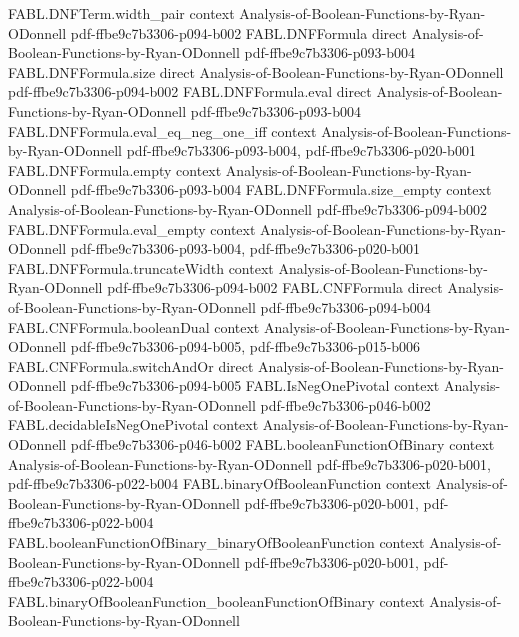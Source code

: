\begin{theorem}
  {FABL.DNFTerm.width_pair}
  {context}
  {Analysis-of-Boolean-Functions-by-Ryan-ODonnell}
  {pdf-ffbe9c7b3306-p094-b002}
\proofstep
  {FABL.DNFFormula}
  {direct}
  {Analysis-of-Boolean-Functions-by-Ryan-ODonnell}
  {pdf-ffbe9c7b3306-p093-b004}
\proofstep
  {FABL.DNFFormula.size}
  {direct}
  {Analysis-of-Boolean-Functions-by-Ryan-ODonnell}
  {pdf-ffbe9c7b3306-p094-b002}
\proofstep
  {FABL.DNFFormula.eval}
  {direct}
  {Analysis-of-Boolean-Functions-by-Ryan-ODonnell}
  {pdf-ffbe9c7b3306-p093-b004}
\proofstep
  {FABL.DNFFormula.eval_eq_neg_one_iff}
  {context}
  {Analysis-of-Boolean-Functions-by-Ryan-ODonnell}
  {pdf-ffbe9c7b3306-p093-b004,
    pdf-ffbe9c7b3306-p020-b001}
\proofstep
  {FABL.DNFFormula.empty}
  {context}
  {Analysis-of-Boolean-Functions-by-Ryan-ODonnell}
  {pdf-ffbe9c7b3306-p093-b004}
\proofstep
  {FABL.DNFFormula.size_empty}
  {context}
  {Analysis-of-Boolean-Functions-by-Ryan-ODonnell}
  {pdf-ffbe9c7b3306-p094-b002}
\proofstep
  {FABL.DNFFormula.eval_empty}
  {context}
  {Analysis-of-Boolean-Functions-by-Ryan-ODonnell}
  {pdf-ffbe9c7b3306-p093-b004,
    pdf-ffbe9c7b3306-p020-b001}
\proofstep
  {FABL.DNFFormula.truncateWidth}
  {context}
  {Analysis-of-Boolean-Functions-by-Ryan-ODonnell}
  {pdf-ffbe9c7b3306-p094-b002}
\proofstep
  {FABL.CNFFormula}
  {direct}
  {Analysis-of-Boolean-Functions-by-Ryan-ODonnell}
  {pdf-ffbe9c7b3306-p094-b004}
\proofstep
  {FABL.CNFFormula.booleanDual}
  {context}
  {Analysis-of-Boolean-Functions-by-Ryan-ODonnell}
  {pdf-ffbe9c7b3306-p094-b005,
    pdf-ffbe9c7b3306-p015-b006}
\proofstep
  {FABL.CNFFormula.switchAndOr}
  {direct}
  {Analysis-of-Boolean-Functions-by-Ryan-ODonnell}
  {pdf-ffbe9c7b3306-p094-b005}
\proofstep
  {FABL.IsNegOnePivotal}
  {context}
  {Analysis-of-Boolean-Functions-by-Ryan-ODonnell}
  {pdf-ffbe9c7b3306-p046-b002}
\proofstep
  {FABL.decidableIsNegOnePivotal}
  {context}
  {Analysis-of-Boolean-Functions-by-Ryan-ODonnell}
  {pdf-ffbe9c7b3306-p046-b002}
\proofstep
  {FABL.booleanFunctionOfBinary}
  {context}
  {Analysis-of-Boolean-Functions-by-Ryan-ODonnell}
  {pdf-ffbe9c7b3306-p020-b001,
    pdf-ffbe9c7b3306-p022-b004}
\proofstep
  {FABL.binaryOfBooleanFunction}
  {context}
  {Analysis-of-Boolean-Functions-by-Ryan-ODonnell}
  {pdf-ffbe9c7b3306-p020-b001,
    pdf-ffbe9c7b3306-p022-b004}
\proofstep
  {FABL.booleanFunctionOfBinary_binaryOfBooleanFunction}
  {context}
  {Analysis-of-Boolean-Functions-by-Ryan-ODonnell}
  {pdf-ffbe9c7b3306-p020-b001,
    pdf-ffbe9c7b3306-p022-b004}
\proofstep
  {FABL.binaryOfBooleanFunction_booleanFunctionOfBinary}
  {context}
  {Analysis-of-Boolean-Functions-by-Ryan-ODonnell}

\end{theorem}
